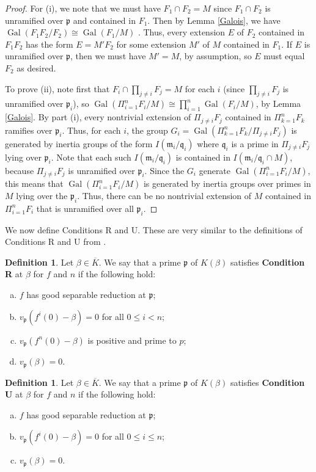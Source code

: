 \documentclass[11pt]{amsart}
\theoremstyle{definition}
\newtheorem{defn}[thm]{Definition}
\theoremstyle{definition}
\numberwithin{thm}{section}
\numberwithin{equation}{thm}
\newcommand{\fp}{\ensuremath{{\mathfrak{p}}}}
\newcommand{\fq}{\ensuremath{{\mathfrak{q}}}}
\newcommand{\fm}{\ensuremath{{\mathfrak{m}}}}
\newcommand{\Kbar}{\ensuremath {\overline K}}
\DeclareMathOperator{\Gal}{Gal}
\begin{document}
\begin{proof}
For (i), we note that we must have $F_1 \cap F_2 = M$ since $F_1 \cap
F_2$ is unramified over $\fp$ and contained in $F_1$.   Then by Lemma
\ref{Galois}, we have $\Gal(F_1 F_2/F_2) \cong \Gal(F_1/M)$ .  Thus,
every extension $E$ of $F_2$ contained in $F_1 F_2$ has the form $E
=M' F_2$ for some extension $M'$ of $M$ contained in $F_1$.   If $E$ is
unramified over $\fp$, then we must have $M'=M$, by assumption, so $E$
must equal $F_2$ as desired.

To prove (ii), note first that $F_i\cap\prod_{j\neq i}F_j = M$ for
each $i$ (since $\prod_{j\neq i}F_j$ is unramified over $\fp_i$), so
$\Gal(\Pi_{i=1}^n F_i/M)\cong\prod_{i=1}^n\Gal(F_i/M)$, by Lemma
\ref{Galois}.  By part (i), every nontrivial extension of $\Pi_{j \not= i} F_j$
contained in $\Pi_{k=1}^n F_k$ ramifies over $\fp_i$.  Thus, for each
$i$, the group $G_i = \Gal(\Pi_{k=1}^n F_k/\Pi_{j \not= i} F_j)$ is
generated by inertia groups of the form $I(\fm_i / \fq_i)$ where
$\fq_i$ is a prime in $\Pi_{j \not= i} F_j$ lying over $\fp_i$. Note
that each such $I(\fm_i / \fq_i)$ is contained in
$I(\fm_i / \fq_i \cap M)$, because $\Pi_{j \not= i} F_j$ is unramified
over $\fp_i$.  Since the $G_i$ generate $\Gal(\Pi_{i=1}^n F_i/M)$,
this means that $\Gal(\Pi_{i=1}^n F_i/M)$ is generated by inertia
groups over primes in $M$ lying over the $\fp_i$.  Thus, there can be no
nontrivial extension of $M$ contained in $\Pi_{i=1}^n F_i$
that is unramified over all $\fp_i$.
 \end{proof}

We now define Conditions R and U.  These are very similar to the
definitions of Conditions R and U from \cite{BT2}.  

\begin{defn}
  Let $\beta \in \Kbar$.  We say that a
  prime $\fp$ of $K(\beta)$ satisfies {\bf Condition R} at
  $\beta$ for $f$ and $n$ if the following hold:
\begin{enumerate}[(a)]
\item $f$ has good separable reduction at $\fp$;
\item $v_\fp(f^i(0) - \beta) = 0$ for all $0 \leq i < n$;
\item $v_\fp(f^n(0) - \beta)$ is positive and prime to $p$;
\item $v_\fp(\beta) = 0$.
\end{enumerate}
\end{defn}

\begin{defn}
  Let $\beta \in \Kbar$.  We say
  that a prime $\fp$ of $K(\beta)$ satisfies {\bf Condition U} at
  $\beta$ for $f$ and $n$ if the following hold:
\begin{enumerate}[(a)]
\item $f$ has good separable reduction at $\fp$;
\item $v_\fp(f^i(0) - \beta) = 0$ for all $0 \leq i \leq n$;
\item $v_\fp(\beta)=0$.
\end{enumerate}
\end{defn}
\end{document}
